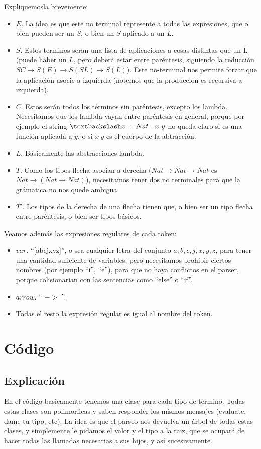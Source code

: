 \documentclass[spanish, a4paper]{article}
\begin{document}
Expliquemosla brevemente:
\begin{itemize}
  \item $E$. La idea es que este no terminal represente a todas las expresiones, que o bien pueden ser un $S$, o bien un $S$ aplicado a un $L$.
  \item $S$. Estos terminos seran una lista de aplicaciones a cosas distintas que un L (puede haber un $L$, pero deberá estar entre paréntesis, siguiendo la reducción $S C \rightarrow S (E) \rightarrow S (S L) \rightarrow S (L)$). Este no-terminal nos permite forzar que la aplicación asocie a izquierda (notemos que la producción es recursiva a izquierda).
  \item $C$. Estos serán todos los términos sin paréntesis, excepto los lambda. Necesitamos que los lambda vayan entre paréntesis en general, porque por ejemplo el string $\textbackslash x\ :\ Nat\ .\ x\ y$ no queda claro si es una función aplicada a $y$, o si $x\ y$ es el cuerpo de la abtracción.
  \item $L$. Básicamente las abstracciones lambda.
  \item $T$. Como los tipos flecha asocian a derecha ($Nat \rightarrow Nat \rightarrow Nat$ es $Nat \rightarrow (Nat \rightarrow Nat)$), necesitamos tener dos no terminales para que la grámatica no nos quede ambigua.
  \item $T'$. Los tipos de la derecha de una flecha tienen que, o bien ser un tipo flecha entre paréntesis, o bien ser tipos básicos.
\end{itemize}

Veamos además las expresiones regulares de cada token:
\begin{itemize}
  \item $var$. ``[abcjxyz]'', o sea cualquier letra del conjunto ${a,b,c,j,x,y,z}$, para tener una cantidad suficiente de variables, pero necesitamos prohibir ciertos nombres (por ejemplo ``i'', ``e''), para que no haya conflictos en el parser, porque colisionarian con las sentencias como ``else'' o ``if''.
  \item $arrow$. `` $- >$ ''.
  \item Todas el resto la expresión regular es igual al nombre del token.
\end{itemize}

\newpage
\section{Código}
\subsection{Explicación}
En el código basicamente tenemos una clase para cada tipo de término. Todas estas clases son polimorficas y saben responder los mismos mensajes (evaluate, dame tu tipo, etc). La idea es que el parseo nos devuelva un árbol de todas estas clases, y simplemente le pidamos el valor y el tipo a la raiz, que se ocupará de hacer todas las  llamadas necesarias a sus hijos, y así sucesivamente.
\end{document}
